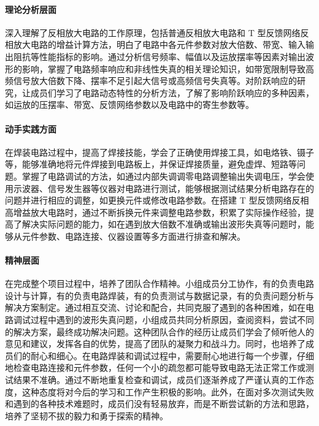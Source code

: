 \documentclass[./测控三级项目.tex]{subfiles} %
\begin{document}
			\paragraph{\qquad 理论分析层面}
			深入理解了反相放大电路的工作原理，包括普通反相放大电路和 T 型反馈网络反相放大电路的增益计算方法，明白了电路中各元件参数对放大倍数、带宽、输入输出阻抗等性能指标的影响。通过分析信号频率、幅值以及运放摆率等因素对输出波形的影响，掌握了电路频率响应和非线性失真的相关理论知识，如带宽限制导致高频信号放大倍数下降、摆率不足引起大信号或高频信号失真等。对阶跃响应的研究，让成员们学习了电路动态特性的分析方法，了解了影响阶跃响应的多种因素，如运放的压摆率、带宽、反馈网络参数以及电路中的寄生参数等。
			\paragraph{\qquad 动手实践方面}
			在焊装电路过程中，提高了焊接技能，学会了正确使用焊接工具，如电烙铁、镊子等，能够准确地将元件焊接到电路板上，并保证焊接质量，避免虚焊、短路等问题。掌握了电路调试的方法，如通过内部失调调零电路调整输出失调电压，学会使用示波器、信号发生器等仪器对电路进行测试，能够根据测试结果分析电路存在的问题并进行相应的调整，如更换元件或修改电路参数。在搭建 T 型反馈网络反相高增益放大电路时，通过不断拆换元件来调整电路参数，积累了实际操作经验，提高了解决实际问题的能力，如在遇到放大倍数不准确或输出波形失真等问题时，能够从元件参数、电路连接、仪器设置等多方面进行排查和解决。
			\paragraph{\qquad 精神层面}
			在完成整个项目过程中，培养了团队合作精神。小组成员分工协作，有的负责电路设计与计算，有的负责电路焊装，有的负责测试与数据记录，有的负责问题分析与解决方案制定。通过相互交流、讨论和配合，共同克服了遇到的各种困难，如在电路调试过程中遇到的波形失真问题，小组成员共同分析原因，查阅资料，尝试不同的解决方案，最终成功解决问题。这种团队合作的经历让成员们学会了倾听他人的意见和建议，发挥各自的优势，提高了团队的凝聚力和战斗力。同时，也培养了成员们的耐心和细心。在电路焊装和调试过程中，需要耐心地进行每一个步骤，仔细地检查电路连接和元件参数，任何一个小的疏忽都可能导致电路无法正常工作或测试结果不准确。通过不断地重复检查和调试，成员们逐渐养成了严谨认真的工作态度，这种态度将对今后的学习和工作产生积极的影响。此外，在面对多次测试失败和遇到的各种技术难题时，成员们没有轻易放弃，而是不断尝试新的方法和思路，培养了坚韧不拔的毅力和勇于探索的精神。
	
	
	
\end{document}
